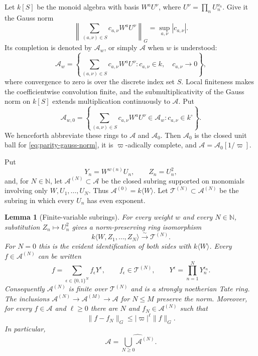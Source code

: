 \documentclass[11pt,reqno]{amsart}
\newtheorem{lemma}[lemma]{Lemma}
\theoremstyle{definition}
\begin{document}
Let $k[S]$ be the monoid algebra with basis $W^aU^\nu$, where
$U^\nu=\prod_nU_n^{\nu_n}$.  Give it the Gauss norm
\begin{equation}\label{eq:parity-gauss-norm}
  \left\lVert\sum_{(a,\nu)\in S}c_{a,\nu}W^aU^\nu\right\rVert_G
  =\sup_{a,\nu}|c_{a,\nu}|.
\end{equation}
Its completion is denoted by $\mathcal A_w$, or simply $\mathcal A$ when
$w$ is understood:
\begin{equation}\label{eq:parity-algebra}
  \mathcal A_w=
  \left\{
    \sum_{(a,\nu)\in S}c_{a,\nu}W^aU^\nu:
    c_{a,\nu}\in k,\quad c_{a,\nu}\longrightarrow0
  \right\},
\end{equation}
where convergence to zero is over the discrete index set $S$.  Local finiteness makes the
coefficientwise convolution finite, and the submultiplicativity of the Gauss norm on $k[S]$
extends multiplication continuously to $\mathcal A$.  Put
\[
  \mathcal A_{w,0}=
  \left\{
    \sum_{(a,\nu)\in S}c_{a,\nu}W^aU^\nu\in\mathcal A_w:
    c_{a,\nu}\in k^\circ
  \right\}.
\]
We henceforth abbreviate these rings to $\mathcal A$ and $\mathcal A_0$.
Then $\mathcal A_0$ is the closed unit ball for \eqref{eq:parity-gauss-norm}, it is
$\varpi$-adically complete, and
$\mathcal A=\mathcal A_0[1/\varpi]$.

Put
\[
  Y_n=W^{w(n)}U_n,\qquad Z_n=U_n^2,
\]
and, for $N\in\mathbb N$, let $\mathcal A^{(N)}\subset\mathcal A$ be the
closed subring supported on monomials involving only
$W,U_1,\ldots,U_N$.  Thus
$\mathcal A^{(0)}=k\langle W\rangle$.  Let
$\mathcal T^{(N)}\subset\mathcal A^{(N)}$ be the subring in which every
$U_n$ has even exponent.

\begin{lemma}[Finite-variable subrings]\label{lem:finite-variable-subrings}
For every weight $w$ and every $N\in\mathbb N$, substitution
$Z_n\mapsto U_n^2$ gives a
norm-preserving ring isomorphism
\[
  k\langle W,Z_1,\ldots,Z_N\rangle
  \xrightarrow{\ \sim\ }\mathcal T^{(N)}.
\]
For $N=0$ this is the evident identification of both sides with
$k\langle W\rangle$.
Every $f\in\mathcal A^{(N)}$ can be written
\begin{equation}\label{eq:finite-variable-decomposition}
  f=\sum_{\epsilon\in\{0,1\}^N} f_\epsilon Y^\epsilon,
  \qquad f_\epsilon\in\mathcal T^{(N)},
  \qquad Y^\epsilon=\prod_{n=1}^NY_n^{\epsilon_n}.
\end{equation}
Consequently $\mathcal A^{(N)}$ is finite over $\mathcal T^{(N)}$ and is
a strongly noetherian Tate ring.  The inclusions
$\mathcal A^{(N)}\to\mathcal A^{(M)}\to\mathcal A$ for $N\leq M$
preserve the norm.  Moreover, for every $f\in\mathcal A$ and $\ell\geq0$
there are $N$ and $f_N\in\mathcal A^{(N)}$ such that
\[
  \lVert f-f_N\rVert_G\leq |\varpi|^\ell\lVert f\rVert_G.
\]
In particular,
\begin{equation}\label{eq:A-completion-finite-variables}
  \mathcal A=\widehat{\bigcup_{N\geq0}\mathcal A^{(N)}}.
\end{equation}
\end{lemma}
\end{document}
